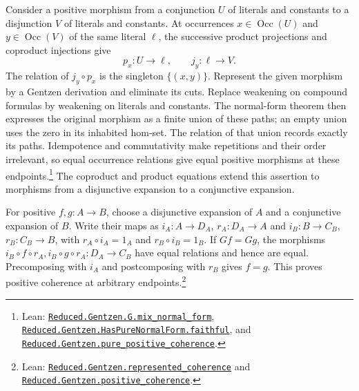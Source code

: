 \documentclass[11pt]{article}
\newcommand{\Occ}{\operatorname{Occ}}
\begin{document}
Consider a positive morphism from a conjunction $U$ of literals
and constants to a disjunction $V$ of literals and constants.
At occurrences $x\in\Occ(U)$ and $y\in\Occ(V)$ of the same
literal $\ell$, the successive product projections and coproduct
injections give
\[
 p_x:U\longrightarrow\ell,\qquad
 j_y:\ell\longrightarrow V.
\]
The relation of $j_y\circ p_x$ is the singleton $\{(x,y)\}$.
Represent the given morphism by a Gentzen derivation and eliminate
its cuts. Replace weakening on compound formulas by weakening on
literals and constants. The normal-form theorem then expresses
the original morphism as a finite union of these paths; an empty
union uses the zero in its inhabited hom-set. The relation of that union records
exactly its paths. Idempotence and commutativity make repetitions
and their order irrelevant, so equal occurrence relations give
equal positive morphisms at these endpoints.\footnote{\raggedright Lean:
\href{https://github.com/flengyel/Dosen-Petric-Maximality/blob/dosen-petric-v25-palomar-v3/DosenPetric/GentzenMixNormalForm.lean\#L37}{\texttt{Reduced.Gentzen.G.\allowbreak{}mix\_normal\_form}},
\href{https://github.com/flengyel/Dosen-Petric-Maximality/blob/dosen-petric-v25-palomar-v3/DosenPetric/GentzenPureNormalForms.lean\#L84}{\texttt{Reduced.Gentzen.HasPureNormalForm.\allowbreak{}faithful}}, and
\href{https://github.com/flengyel/Dosen-Petric-Maximality/blob/dosen-petric-v25-palomar-v3/DosenPetric/GentzenPurePositiveCoherence.lean\#L14}{\texttt{Reduced.Gentzen.\allowbreak{}pure\_positive\_coherence}}.}
The coproduct and product equations extend this assertion to
morphisms from a disjunctive expansion to a conjunctive expansion.

For positive $f,g:A\to B$, choose a disjunctive expansion of $A$
and a conjunctive expansion of $B$. Write their maps as
$i_A:A\to D_A$, $r_A:D_A\to A$ and
$i_B:B\to C_B$, $r_B:C_B\to B$, with
$r_A\circ i_A=1_A$ and $r_B\circ i_B=1_B$.
If $Gf=Gg$, the morphisms
$i_B\circ f\circ r_A,i_B\circ g\circ r_A:D_A\to C_B$
have equal relations and hence are equal. Precomposing with
$i_A$ and postcomposing with $r_B$ gives $f=g$.
This proves positive coherence at arbitrary endpoints.\footnote{\raggedright Lean:
\href{https://github.com/flengyel/Dosen-Petric-Maximality/blob/dosen-petric-v25-palomar-v3/DosenPetric/GentzenPositiveCoherence.lean\#L14}{\texttt{Reduced.Gentzen.\allowbreak{}represented\_coherence}} and
\href{https://github.com/flengyel/Dosen-Petric-Maximality/blob/dosen-petric-v25-palomar-v3/DosenPetric/GentzenPositiveCoherence.lean\#L31}{\texttt{Reduced.Gentzen.\allowbreak{}positive\_coherence}}.}
\end{document}
